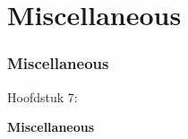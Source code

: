 %

\section{Miscellaneous}
\begin{frame}[fragile]
	\frametitle{Miscellaneous}

	\begin{center}\huge{Hoofdstuk 7:}\end{center}
	\begin{center}\huge{\color{typo3darkgrey}\textbf{Miscellaneous}}\end{center}

\end{frame}

